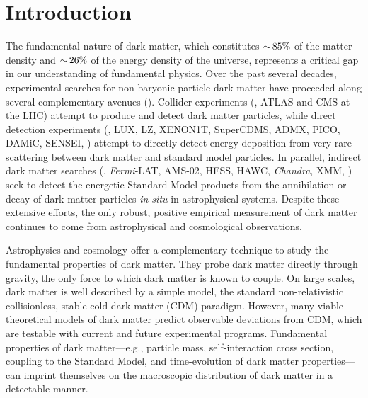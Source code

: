 \chapter{Introduction} 
\label{sec:intro}
\bigskip
{}

The fundamental nature of dark matter, which constitutes $ {\sim}\, 85\%$ of the matter density and $ {\sim}\, 26\%$ of the energy density of the universe, represents a critical gap in our understanding of fundamental physics.
Over the past several decades, experimental searches for non-baryonic particle dark matter have proceeded along several complementary avenues ().
Collider experiments (\eg, ATLAS and CMS at the LHC) attempt to produce and detect dark matter particles, while  %
direct detection experiments (\eg, LUX, LZ, XENON1T, SuperCDMS, ADMX, PICO, DAMiC, SENSEI, \etc) attempt to directly detect energy deposition from very rare scattering between dark matter and standard model particles.
In parallel, indirect dark matter searches (\eg, {\it Fermi}-LAT, AMS-02, HESS, HAWC, {\it Chandra}, XMM, \etc) seek to detect the energetic Standard Model products from the annihilation or decay of dark matter particles {\it in situ} in astrophysical systems. %
Despite these extensive efforts, the only robust, positive empirical measurement of dark matter continues to come from astrophysical and cosmological observations. 

Astrophysics and cosmology offer a complementary technique to study the fundamental properties of dark matter. 
They probe dark matter directly through gravity, the only force to which dark matter is known to couple. On large scales, dark matter is well described by a simple model, the standard non-relativistic collisionless, stable cold dark matter (CDM) paradigm.
However, many viable theoretical models of dark matter predict observable deviations from CDM, which are testable with current and future experimental programs.
Fundamental properties of dark matter---e.g., particle mass, self-interaction cross section, coupling to the Standard Model, and time-evolution of dark matter properties---can imprint themselves on the macroscopic distribution of dark matter in a detectable manner.

